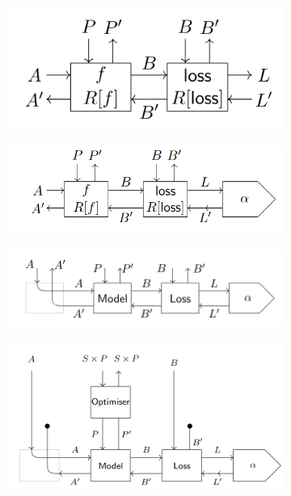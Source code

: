 \documentclass[11pt,a4paper,openright,twoside]{report}
\theoremstyle{plain}
\theoremstyle{definition}
\begin{document}
\begin{figure}[h]
  \begin{center}
    \begin{subfigure}{0.3\textwidth}
      \includegraphics[width=\textwidth]{figures/lenses_model_loss.png}
      \caption{}
    \end{subfigure}
    \begin{subfigure}{0.4\textwidth}
      \includegraphics[width=\textwidth]{figures/lenses_model_loss_optimizer.png}
      \caption{}
    \end{subfigure}
    \begin{subfigure}{0.5\textwidth}
      \includegraphics[width=\textwidth]{figures/lenses_supervised_learning1.png}
      \caption{}
    \end{subfigure}   
    \begin{subfigure}{0.5\textwidth}
      \includegraphics[width=\textwidth]{figures/lenses_supervised_learning2.png}

\end{subfigure}
\end{center}
\end{figure}
\end{document}
